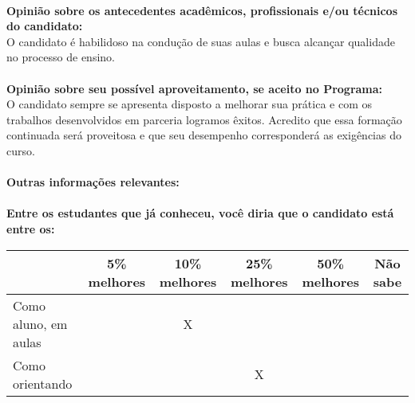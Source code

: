 \documentclass[11pt]{article}
\begin{document}
\\
\textbf{Opinião sobre os antecedentes acadêmicos, profissionais e/ou técnicos do candidato:}
\\O candidato é habilidoso na condução de suas aulas e busca alcançar qualidade no processo de ensino.\\
\\
\textbf{Opinião sobre seu possível aproveitamento, se aceito no Programa:}
\\O candidato sempre se apresenta disposto a melhorar sua prática e com os trabalhos desenvolvidos em parceria logramos êxitos. Acredito que essa formação continuada será proveitosa e que seu desempenho corresponderá as exigências do curso.\\ 
\\
\textbf{Outras informações relevantes:} \\
\\[0.3cm]
\textbf{Entre os estudantes que já conheceu, você diria que o candidato está entre os:}
\\
\begin{tabular}{|l|c|c|c|c|c|}
\hline
 & 5\% melhores & 10\% melhores & 25\% melhores & 50\% melhores & Não sabe \\
\hline
Como aluno, em aulas &  & X &  &  & \\
\hline
Como orientando &  &  & X &  & \\
\hline
\end{tabular}
\end{document}
